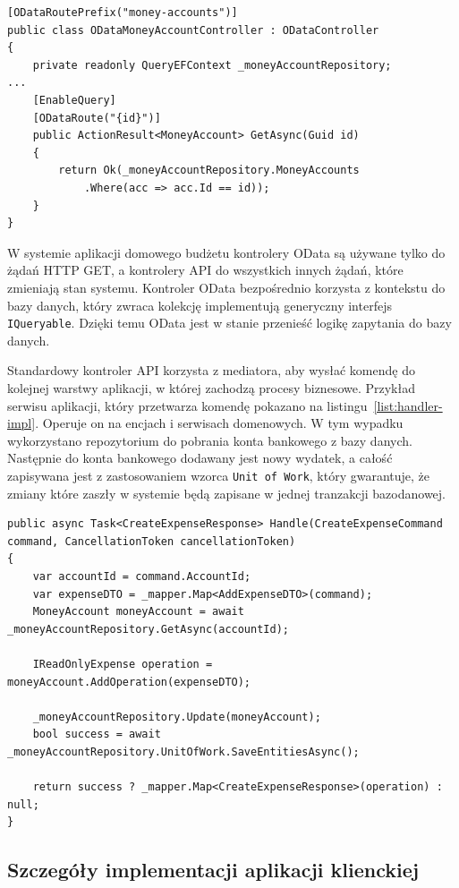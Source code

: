 {\belowcaptionskip=-10pt
\begin{lstlisting}[label=list:odata-ctrl-1,
    caption=Przykład implementacji kontrolera OData]
[ODataRoutePrefix("money-accounts")]
public class ODataMoneyAccountController : ODataController
{
    private readonly QueryEFContext _moneyAccountRepository;
...
    [EnableQuery]
    [ODataRoute("{id}")]
    public ActionResult<MoneyAccount> GetAsync(Guid id)
    {
        return Ok(_moneyAccountRepository.MoneyAccounts
            .Where(acc => acc.Id == id));
    }
}
\end{lstlisting}
}

W systemie aplikacji domowego budżetu kontrolery OData są używane tylko do żądań HTTP GET, a kontrolery API do wszystkich innych żądań, które zmieniają stan systemu.
Kontroler OData bezpośrednio korzysta z kontekstu do bazy danych, który zwraca kolekcję implementują generyczny interfejs \texttt{IQueryable}. Dzięki temu OData jest w stanie przenieść logikę zapytania do bazy danych.

Standardowy kontroler API korzysta z mediatora, aby wysłać komendę do kolejnej warstwy aplikacji, w której zachodzą procesy biznesowe. Przykład serwisu aplikacji, który przetwarza komendę pokazano na listingu~\ref{list:handler-impl}. Operuje on na encjach i serwisach domenowych. W tym wypadku wykorzystano repozytorium do pobrania konta bankowego z bazy danych. Następnie do konta bankowego dodawany jest nowy wydatek, a całość zapisywana jest z zastosowaniem wzorca \texttt{Unit of Work}, który gwarantuje, że zmiany które zaszły w systemie będą zapisane w jednej tranzakcji bazodanowej. 

{\belowcaptionskip=-10pt
\begin{lstlisting}[label=list:handler-impl,
    caption=Przykład implementacji handlera aplikacji]
public async Task<CreateExpenseResponse> Handle(CreateExpenseCommand command, CancellationToken cancellationToken)
{
    var accountId = command.AccountId;
    var expenseDTO = _mapper.Map<AddExpenseDTO>(command);
    MoneyAccount moneyAccount = await _moneyAccountRepository.GetAsync(accountId);

    IReadOnlyExpense operation = moneyAccount.AddOperation(expenseDTO);

    _moneyAccountRepository.Update(moneyAccount);
    bool success = await _moneyAccountRepository.UnitOfWork.SaveEntitiesAsync();

    return success ? _mapper.Map<CreateExpenseResponse>(operation) : null;
}
\end{lstlisting}
}

\subsection{Szczegóły implementacji aplikacji klienckiej}
\label{subsec:szczegoly-implementacji-client}

